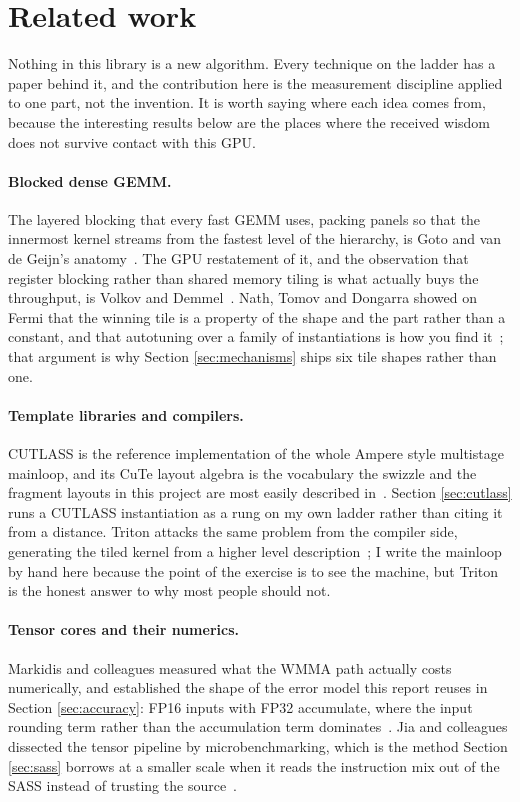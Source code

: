\section{Related work}
\label{sec:related}

Nothing in this library is a new algorithm. Every technique on the ladder has a
paper behind it, and the contribution here is the measurement discipline applied
to one part, not the invention. It is worth saying where each idea comes from,
because the interesting results below are the places where the received wisdom
does not survive contact with this GPU.

\paragraph{Blocked dense GEMM.} The layered blocking that every fast GEMM uses,
packing panels so that the innermost kernel streams from the fastest level of the
hierarchy, is Goto and van de Geijn's anatomy~\cite{goto2008}. The GPU restatement
of it, and the observation that register blocking rather than shared memory
tiling is what actually buys the throughput, is Volkov and Demmel~\cite{volkov2008}.
Nath, Tomov and Dongarra showed on Fermi that the winning tile is a property of
the shape and the part rather than a constant, and that autotuning over a family
of instantiations is how you find it~\cite{nath2010}; that argument is why Section
\ref{sec:mechanisms} ships six tile shapes rather than one.

\paragraph{Template libraries and compilers.} CUTLASS is the reference
implementation of the whole Ampere style multistage mainloop, and its CuTe layout
algebra is the vocabulary the swizzle and the fragment layouts in this project are
most easily described in~\cite{cutlass}. Section \ref{sec:cutlass} runs a CUTLASS
instantiation as a rung on my own ladder rather than citing it from a distance.
Triton attacks the same problem from the compiler side, generating the tiled
kernel from a higher level description~\cite{tillet2019}; I write the mainloop by
hand here because the point of the exercise is to see the machine, but Triton is
the honest answer to why most people should not.

\paragraph{Tensor cores and their numerics.} Markidis and colleagues measured what
the WMMA path actually costs numerically, and established the shape of the error
model this report reuses in Section \ref{sec:accuracy}: FP16 inputs with FP32
accumulate, where the input rounding term rather than the accumulation term
dominates~\cite{markidis2018}. Jia and colleagues dissected the tensor pipeline by
microbenchmarking, which is the method Section \ref{sec:sass} borrows at a smaller
scale when it reads the instruction mix out of the SASS instead of trusting the
source~\cite{jia2018}.

